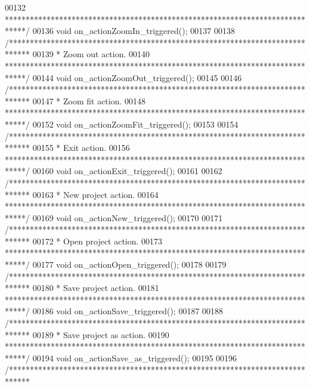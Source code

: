 \begin{DoxyCode}
00132 \textcolor{comment}{  *****************************************************************************/}
00136   \textcolor{keywordtype}{void} on\_actionZoomIn\_triggered();
00137 
00138   \textcolor{comment}{/*****************************************************************************}
00139 \textcolor{comment}{  * Zoom out action.}
00140 \textcolor{comment}{  *****************************************************************************/}
00144   \textcolor{keywordtype}{void} on\_actionZoomOut\_triggered();
00145 
00146   \textcolor{comment}{/*****************************************************************************}
00147 \textcolor{comment}{  * Zoom fit action.}
00148 \textcolor{comment}{  *****************************************************************************/}
00152   \textcolor{keywordtype}{void} on\_actionZoomFit\_triggered();
00153 
00154   \textcolor{comment}{/*****************************************************************************}
00155 \textcolor{comment}{  * Exit action.}
00156 \textcolor{comment}{  *****************************************************************************/}
00160   \textcolor{keywordtype}{void} on\_actionExit\_triggered();
00161 
00162   \textcolor{comment}{/*****************************************************************************}
00163 \textcolor{comment}{  * New project action.}
00164 \textcolor{comment}{  *****************************************************************************/}
00169   \textcolor{keywordtype}{void} on\_actionNew\_triggered();
00170 
00171   \textcolor{comment}{/*****************************************************************************}
00172 \textcolor{comment}{  * Open project action.}
00173 \textcolor{comment}{  *****************************************************************************/}
00177   \textcolor{keywordtype}{void} on\_actionOpen\_triggered();
00178 
00179   \textcolor{comment}{/*****************************************************************************}
00180 \textcolor{comment}{  * Save project action.}
00181 \textcolor{comment}{  *****************************************************************************/}
00186   \textcolor{keywordtype}{void} on\_actionSave\_triggered();
00187 
00188   \textcolor{comment}{/*****************************************************************************}
00189 \textcolor{comment}{  * Save project as action.}
00190 \textcolor{comment}{  *****************************************************************************/}
00194   \textcolor{keywordtype}{void} on\_actionSave\_as\_triggered();
00195 
00196   \textcolor{comment}{/*****************************************************************************}

\end{DoxyCode}
